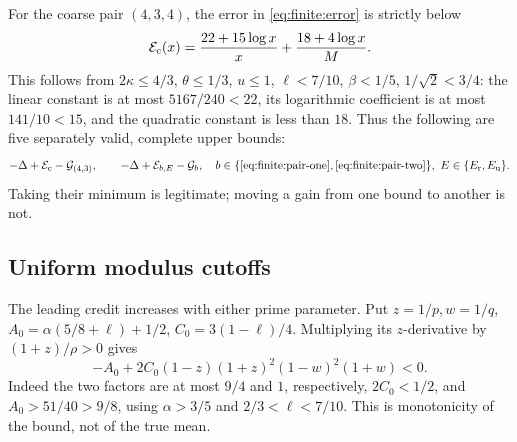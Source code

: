 \documentclass[11pt]{article}
\theoremstyle{definition}\newtheorem{definition}[theorem]{Definition}
\theoremstyle{remark}\newtheorem{remark}[theorem]{Remark}
\begin{document}
For the coarse pair \((4,3,4)\), the error in \eqref{eq:finite:error} is
strictly below
\[
 {\cal E}_{\rm c}(x)=\frac{22+15\log x}{x}
                           +\frac{18+4\log x}{M}.
\]
This follows from
\(2\kappa\le4/3\), \(\theta\le1/3\), \(u\le1\),
\(\ell<7/10\), \(\beta<1/5\), \(1/\sqrt2<3/4\):
the linear constant is at most \(5167/240<22\), its logarithmic
coefficient is at most \(141/10<15\), and the quadratic constant is
less than \(18\).
Thus the following are five separately valid, complete upper bounds:
\[
 -\Delta+{\cal E}_{\rm c}-{\cal G}_{(4,3)},\qquad
 -\Delta+{\cal E}_{b,E}-{\cal G}_b,\quad
 b\in\{\eqref{eq:finite:pair-one},\eqref{eq:finite:pair-two}\},\
 E\in\{E_{\rm r},E_{\rm u}\}.
\]
Taking their minimum is legitimate; moving a gain from one bound to
another is not.

\subsection{Uniform modulus cutoffs}
\label{ap:finite:cutoffs}

The leading credit increases with either prime parameter.  Put
\(z=1/p,w=1/q\), \(A_0=\alpha(5/8+\ell)+1/2\),
\(C_0=3(1-\ell)/4\).  Multiplying its \(z\)-derivative by
\((1+z)/\rho>0\) gives
\[
 -A_0+2C_0(1-z)(1+z)^2(1-w)^2(1+w)<0.
\]
Indeed the two factors are at most \(9/4\) and \(1\), respectively,
\(2C_0<1/2\), and \(A_0>51/40>9/8\), using
\(\alpha>3/5\) and \(2/3<\ell<7/10\).
This is monotonicity of the bound, not of the true mean.
\end{document}
